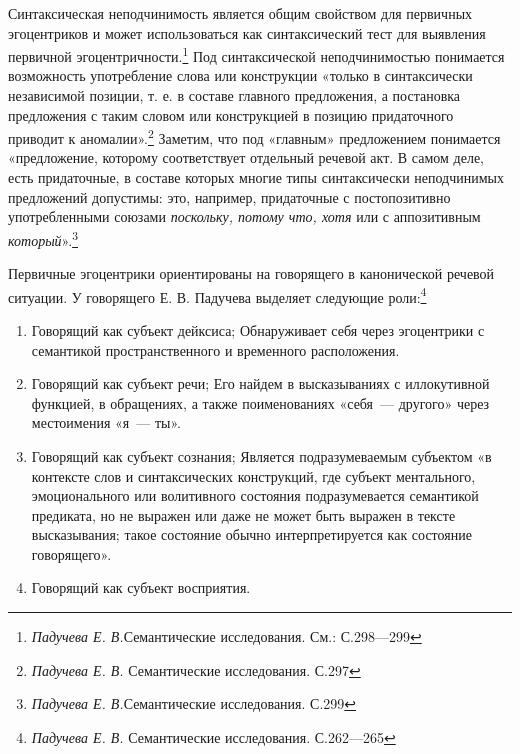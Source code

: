 \documentclass{kursa4}
\begin{document}
{      Синтаксическая неподчинимость является общим свойством для первичных эгоцентриков и может использоваться как синтаксический тест для выявления первичной эгоцентричности.\footnote{\textit{Падучева Е. В.}Семантические исследования. См.: С.298—299} Под синтаксической неподчинимостью понимается возможность употребление слова или конструкции «только в синтаксически независимой позиции, т. е. в составе главного предложения, а постановка предложения с таким словом или конструкцией в позицию придаточного приводит к аномалии».\footnote{\textit{ Падучева Е. В. }Семантические исследования. С.297} Заметим, что под «главным» предложением понимается «предложение, которому соответствует отдельный речевой акт. В самом деле, есть придаточные, в составе которых многие типы синтаксически неподчинимых предложений допустимы: это, например, придаточные с постопозитивно употребленными союзами \textit{поскольку, потому что, хотя} или с аппозитивным \textit{который}».\footnote{\textit{Падучева Е. В.}Семантические исследования. С.299}

      Первичные эгоцентрики ориентированы на говорящего в канонической речевой ситуации. У говорящего Е. В. Падучева выделяет следующие роли:\footnote{\textit{Падучева Е. В.} Семантические исследования. С.262—265}

      \begin{enumerate}

        \item Говорящий как субъект дейксиса; \newline
        Обнаруживает себя через эгоцентрики с семантикой пространственного и временного расположения. 

        \item Говорящий как субъект речи; \newline
        Его найдем в высказываниях с иллокутивной функцией, в обращениях, а также поименованиях «себя~--- другого» через местоимения «я~--- ты». \item Говорящий как субъект сознания; \newline
        Является подразумеваемым субъектом «в контексте слов и синтаксических конструкций, где субъект ментального, эмоционального или волитивного состояния подразумевается семантикой предиката, но не выражен или даже не может быть выражен в тексте высказывания; такое состояние обычно интерпретируется как состояние говорящего». 

        \item Говорящий как субъект восприятия. \end{enumerate}

}
\end{document}
